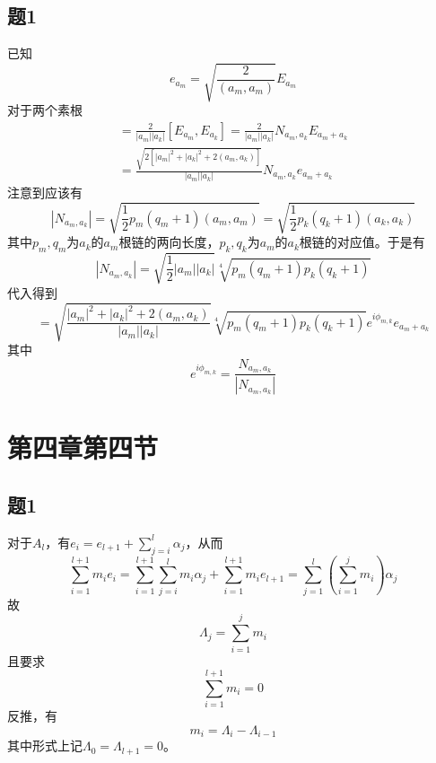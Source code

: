 \documentclass{ctexart}
\begin{document}
	\subsection{题1}
	
	已知
	\begin{equation}
	e_{a_m}=\sqrt{\frac{2}{(a_m,a_m)}}E_{a_m}
	\end{equation}
	对于两个素根
	\begin{multline}
	[e_{a_m},e_{a_k}]=\frac{2}{|a_m||a_k|}[E_{a_m},E_{a_k}]=\frac{2}{|a_m||a_k|}N_{a_m,a_k}E_{a_m+a_k}\\=\frac{\sqrt{2\left[|a_m|^2+|a_k|^2+2(a_m,a_k)\right]}}{|a_m||a_k|}N_{a_m,a_k}e_{a_m+a_k}
	\end{multline}
	注意到应该有
	\begin{equation}
	|N_{a_m,a_k}|=\sqrt{\frac{1}{2}p_m(q_m+1)(a_m,a_m)}=\sqrt{\frac{1}{2}p_k(q_k+1)(a_k,a_k)}
	\end{equation}
	其中$p_m,q_m$为$a_k$的$a_m$根链的两向长度，$p_k,q_k$为$a_m$的$a_k$根链的对应值。于是有
	\begin{equation}
	|N_{a_m,a_k}|=\sqrt{\frac{1}{2}|a_m||a_k|}\sqrt[4]{p_m(q_m+1)p_k(q_k+1)}
	\end{equation}
	代入得到
	\begin{equation}
	[e_{a_m},e_{a_k}]=\sqrt{\frac{|a_m|^2+|a_k|^2+2(a_m,a_k)}{|a_m||a_k|}}\sqrt[4]{p_m(q_m+1)p_k(q_k+1)}e^{i\phi_{m,k}}e_{a_m+a_k}
	\end{equation}
	其中
	\begin{equation}
	e^{i\phi_{m,k}}=\frac{N_{a_m,a_k}}{|N_{a_m,a_k}|}
	\end{equation}
	
	\section{第四章第四节}
	
	\subsection{题1}
	
	对于$A_l$，有$e_i=e_{l+1}+\sum_{j=i}^l\alpha_j$，从而
	\begin{equation}
	\sum_{i=1}^{l+1}m_ie_i=\sum_{i=1}^{l+1}\sum_{j=i}^lm_i\alpha_j+\sum_{i=1}^{l+1}m_ie_{l+1}=\sum_{j=1}^l\left(\sum_{i=1}^j m_i\right)\alpha_j
	\end{equation}
	故
	\begin{equation}
	\Lambda_j=\sum_{i=1}^j m_i
	\end{equation}
	且要求
	\begin{equation}
	\sum_{i=1}^{l+1}m_i=0
	\end{equation}
	反推，有
	\begin{equation}
	m_i=\Lambda_{i}-\Lambda_{i-1}
	\end{equation}
	其中形式上记$\Lambda_0=\Lambda_{l+1}=0$。
	
\end{document}
